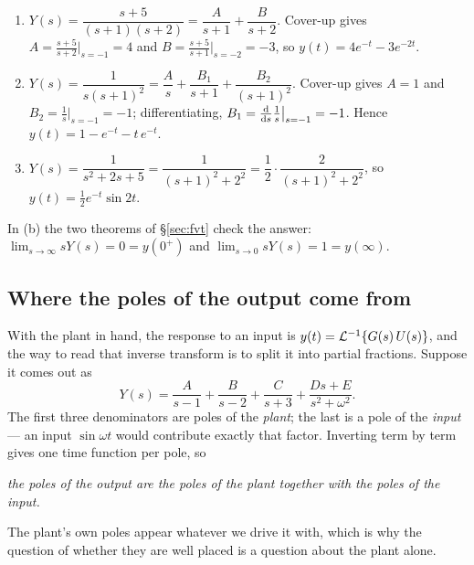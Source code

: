 \documentclass[11pt]{article}
\begin{document}
\begin{example}\label{ex:pfe}
\begin{enumerate}[label=(\alph*),itemsep=3pt,leftmargin=*]
\item $Y(s)=\dfrac{s+5}{(s+1)(s+2)}=\dfrac{A}{s+1}+\dfrac{B}{s+2}$. Cover-up gives
$A=\frac{s+5}{s+2}\big|_{s=-1}=4$ and $B=\frac{s+5}{s+1}\big|_{s=-2}=-3$, so
$y(t)=4e^{-t}-3e^{-2t}$.
\item $Y(s)=\dfrac{1}{s(s+1)^{2}}=\dfrac{A}{s}+\dfrac{B_1}{s+1}+\dfrac{B_2}{(s+1)^{2}}$.
Cover-up gives $A=1$ and $B_2=\frac1s\big|_{s=-1}=-1$; differentiating,
$B_1=\frac{\mathrm{d}}{\mathrm{d} s}\frac1s\big|_{s=-1}=-1$. Hence
$y(t)=1-e^{-t}-t\,e^{-t}$.
\item $Y(s)=\dfrac{1}{s^{2}+2s+5}=\dfrac{1}{(s+1)^{2}+2^{2}}
=\dfrac12\cdot\dfrac{2}{(s+1)^{2}+2^{2}}$, so $y(t)=\tfrac12e^{-t}\sin 2t$.
\end{enumerate}
In (b) the two theorems of \S\ref{sec:fvt} check the answer:
$\lim_{s\to\infty}sY(s)=0=y(0^{+})$ and $\lim_{s\to0}sY(s)=1=y(\infty)$.
\end{example}

\subsection{Where the poles of the output come from}\label{sec:outputpoles}
With the plant in hand, the response to an input is
$y(t) = \mathcal{L}^{-1}\{G(s)\,U(s)\}$, and the way to read that inverse transform is to
split it into partial fractions. Suppose it comes out as
\begin{equation}\label{eq:pfe}
   Y(s) = \frac{A}{s-1} + \frac{B}{s-2} + \frac{C}{s+3}
        + \frac{Ds+E}{s^{2}+\omega^{2}} .
\end{equation}
The first three denominators are poles of the \emph{plant}; the last is a pole of
the \emph{input} --- an input $\sin\omega t$ would contribute exactly that factor.
Inverting term by term gives one time function per pole, so
\begin{center}
\emph{the poles of the output are the poles of the plant together with the poles
of the input.}
\end{center}
The plant's own poles appear whatever we drive it with, which is why the question
of whether they are well placed is a question about the plant alone.
\end{document}
